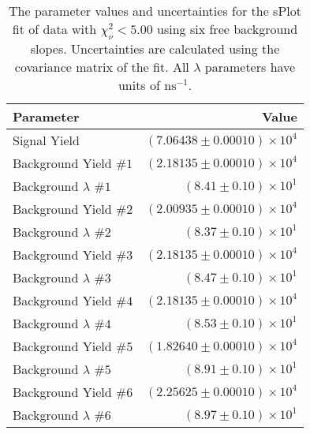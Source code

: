 
\begin{table}[ht]
    \begin{center}
        \begin{tabular}{lr}\toprule
            Parameter & Value \\\midrule
            Signal Yield & $(7.06438 \pm 0.00010) \times 10^{4}$ \\
            Background Yield $\#1$ & $(2.18135 \pm 0.00010) \times 10^{4}$ \\
            Background $\lambda$ $\#1$ & $(8.41 \pm 0.10) \times 10^{1}$ \\
            Background Yield $\#2$ & $(2.00935 \pm 0.00010) \times 10^{4}$ \\
            Background $\lambda$ $\#2$ & $(8.37 \pm 0.10) \times 10^{1}$ \\
            Background Yield $\#3$ & $(2.18135 \pm 0.00010) \times 10^{4}$ \\
            Background $\lambda$ $\#3$ & $(8.47 \pm 0.10) \times 10^{1}$ \\
            Background Yield $\#4$ & $(2.18135 \pm 0.00010) \times 10^{4}$ \\
            Background $\lambda$ $\#4$ & $(8.53 \pm 0.10) \times 10^{1}$ \\
            Background Yield $\#5$ & $(1.82640 \pm 0.00010) \times 10^{4}$ \\
            Background $\lambda$ $\#5$ & $(8.91 \pm 0.10) \times 10^{1}$ \\
            Background Yield $\#6$ & $(2.25625 \pm 0.00010) \times 10^{4}$ \\
            Background $\lambda$ $\#6$ & $(8.97 \pm 0.10) \times 10^{1}$ \\\bottomrule
        \end{tabular}
        \caption{The parameter values and uncertainties for the sPlot fit of data with $\chi^2_\nu < 5.00$ using six free background slopes. Uncertainties are calculated using the covariance matrix of the fit. All $\lambda$ parameters have units of $\si{\nano\second}^{-1}$.}\label{tab:splot-fit-results-chisqdof-5.00-free-6}
    \end{center}
\end{table}

